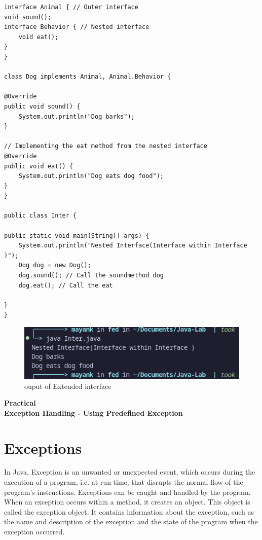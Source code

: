 \documentclass[a4paper,12pt]{article}
\newcounter{practicalno} %
\newcommand{\practicaltitle}[1]{
    \stepcounter{practicalno} %
    \newpage
    \begin{center}
        \vspace{1cm}
        \Large\textbf{Practical \thepracticalno} \\
        \vspace{0.5cm}
        \Large\textbf{#1} %
        \normalsize\vspace{1cm}
    \end{center}
}
\begin{document}
\begin{lstlisting}    
interface Animal { // Outer interface 
void sound();
interface Behavior { // Nested interface 
    void eat();
}
}

class Dog implements Animal, Animal.Behavior {

@Override
public void sound() {
    System.out.println("Dog barks");
}

// Implementing the eat method from the nested interface
@Override
public void eat() {
    System.out.println("Dog eats dog food");
}
}

public class Inter {

public static void main(String[] args) {
    System.out.println("Nested Interface(Interface within Interface )");
    Dog dog = new Dog();
    dog.sound(); // Call the soundmethod dog
    dog.eat(); // Call the eat

}
}

\end{lstlisting}
\begin{figure}[H]
    \centering
    \includegraphics[width=0.9\linewidth]{images/Inter.png}
    \caption{ouput of Extended interface}
    \label{fig:sample_image}
\end{figure}

\setcounter{section}{0}
\practicaltitle{Exception Handling - Using Predefined Exception}

\section{Exceptions}
In Java, Exception is an unwanted or unexpected event, which occurs during the execution of a program, i.e. at run time, that disrupts the normal flow of the program’s instructions. Exceptions can be caught and handled by the program. When an exception occurs within a method, it creates an object. This object is called the exception object. It contains information about the exception, such as the name and description of the exception and the state of the program when the exception occurred.
\end{document}
